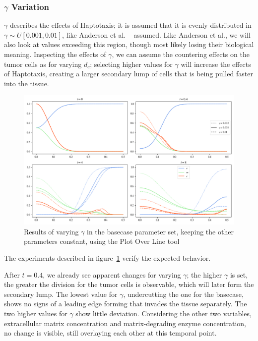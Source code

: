 \subsubsection*{$\gamma$ Variation}
$\gamma$ describes the effects of Haptotaxis; it is assumed that it is evenly distributed in $\gamma \sim U[0.001,0.01]$, like Anderson et al. ~\cite{anderson_mathematical_2000} assumed. Like Anderson et al., we will also look at values exceeding this region, though most likely losing their biological meaning. Inspecting the effects of $\gamma$, we can assume the countering effects on the tumor cells as for varying $d_c$; selecting higher values for $\gamma$ will increase the effects of Haptotaxis, creating a larger secondary lump of cells that is being pulled faster into the tissue.
\begin{figure}[h!]
 \centering
 \includegraphics[width=\textwidth]{resources/images/gamma_variation.png}
 \caption{Results of varying $\gamma$ in the basecase parameter set, keeping the other parameters constant, using the Plot Over Line tool}
 \label{fig:gamma_variation}
\end{figure}
The experiments described in figure~\ref{fig:gamma_variation} verify the expected behavior.

After $t=0.4$, we already see apparent changes for varying $\gamma$; the higher $\gamma$ is set, the greater the division for the tumor cells is observable, which will later form the secondary lump. The lowest value for $\gamma$, undercutting the one for the basecase, shows no signs of a leading edge forming that invades the tissue separately. The two higher values for $\gamma$ show little deviation. Considering the other two variables, extracellular matrix concentration and matrix-degrading enzyme concentration, no change is visible, still overlaying each other at this temporal point.

